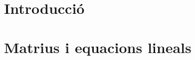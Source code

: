 \documentclass[11pt,fleqn]{book} %
\newcounter{let} \setcounter{let}{0}
\renewcommand{\1}{\mathbf{1}}
\newcommand{\0}{\mathbf{0}}
\begin{document}

\usechapterimagefalse %

\pagestyle{empty} %

\tableofcontents %

\cleardoublepage %

\pagestyle{fancy} %



\usechapterimagetrue
{} %
\chapter{Introducció}
{
\let\subsection\subsubsection
\let\subsubsection\paragraph

}
\chapter{Matrius i equacions lineals}
{
\let\subsection\subsubsection
\let\subsubsection\paragraph

}
\end{document}
